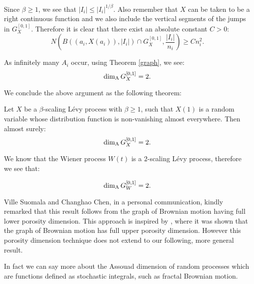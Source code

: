 Since $\beta\geq 1$, we see that $|I_i|\leq |I_i|^{1/\beta}$. Also remember that $X$ can be taken to be a right continuous function and we also include the vertical segments of the jumps in $G^{[0,1]}_X$. Therefore it is clear that there exist an absolute constant $C>0$:
\[
N\left(B\left(\left(a_i,X(a_i)\right),|I_i|\right)\cap G_X^{[0,1]},\frac{|I_i|}{n_i}\right)\geq C n_i^2.
\] 

As infinitely many $A_i$ occur, using Theorem \ref{graph}, we see:
\[
\dim_{\textup{A}} G_{X}^{[0,1]}=2.
\]

We conclude the above argument as the following theorem:
\begin{theorem}\label{Main}
	Let $X$ be a $\beta$-scaling L\'evy process with $\beta\geq 1$, such that $X(1)$ is a random variable whose distribution function is non-vanishing almost everywhere. Then almost surely:
	\[
	\dim_{\textup{A}} G_{X}^{[0,1]}=2.
	\]
\end{theorem}

We know that the Wiener process $W(t)$ is a $2$-scaling L\'evy process, therefore we see that:
\begin{corollary}
	\[
	\dim_{\textup{A}} G_{W}^{[0,1]}=2.
	\]
\end{corollary}

Ville Suomala and Changhao Chen, in a personal communication, kindly remarked that this result follows from the graph of Brownian motion having full lower porosity dimension. This approach is inspired by \cite{coxgriffin}, where it was shown that the graph of Brownian motion has full upper porosity dimension. However this porosity dimension technique does not extend to our following, more general result.

In fact we can say more about the Assouad dimension of random processes which are functions defined as stochastic integrals, such as fractal Brownian motion. 

